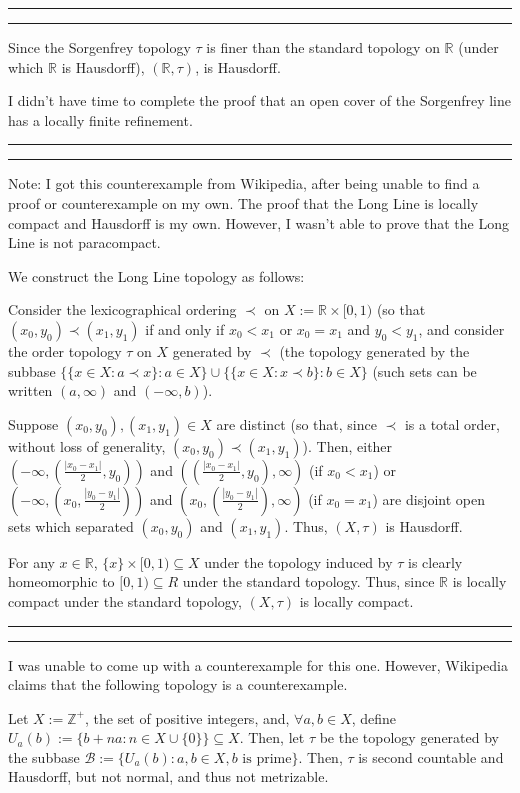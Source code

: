 \documentclass[11pt]{article}
\newcounter{questionCounter}
\newcounter{partCounter}[questionCounter]
\newenvironment{question}[2][\arabic{questionCounter}]{%
    \setcounter{partCounter}{0}%
    \vspace{.25in} \hrule \vspace{0.5em}%
        \noindent{\bf #2}%
    \vspace{0.8em} \hrule \vspace{.10in}%
    \addtocounter{questionCounter}{1}%
}{}
\newcommand{\B}{\mathcal{B}}
\newcommand{\Z}{\mathbb{Z}} %
\newcommand{\R}{\mathbb{R}} %
\begin{document}
\begin{question}{Problem 3}
Since the Sorgenfrey topology $\tau$ is finer than the standard topology on
$\R$ (under which $\R$ is Hausdorff), $(\R,\tau)$, is Hausdorff.

I didn't have time to complete the proof that an open cover of the Sorgenfrey
line has a locally finite refinement.
\end{question}

\begin{question}{Problem 4}
Note: I got this counterexample from Wikipedia, after being unable to find a
proof or counterexample on my own. The proof that the Long Line is locally
compact and Hausdorff is my own. However, I wasn't able to prove that the Long
Line is not paracompact.

We construct the Long Line topology as follows:

Consider the lexicographical ordering $\prec$ on $X := \R \times [0,1)$ (so
that $(x_0,y_0) \prec (x_1,y_1)$ if and only if $x_0 < x_1$ or $x_0 = x_1$ and
$y_0 < y_1$, and consider the order topology $\tau$ on $X$ generated by
$\prec$ (the topology generated by the subbase
$\{\{x \in X : a \prec x\} : a \in X\}
 \cup \{\{x \in X : x \prec b\} : b \in X\}$ (such sets can be written
$(a,\infty)$ and $(-\infty,b)$).

Suppose $(x_0,y_0), (x_1,y_1) \in X$ are distinct (so that, since $\prec$ is a
total order, without loss of generality, $(x_0,y_0) \prec (x_1,y_1)$). Then,
either $\left(-\infty,\left(\frac{|x_0 - x_1|}{2},y_0\right)\right)$ and
$\left(\left(\frac{|x_0 - x_1|}{2},y_0\right),\infty\right)$ (if $x_0 < x_1$)
or $\left(-\infty,\left(x_0,\frac{|y_0 - y_1|}{2}\right)\right)$ and
$\left(x_0,\left(\frac{|y_0 - y_1|}{2}\right),\infty\right)$ (if $x_0 = x_1$)
are disjoint open sets which separated $(x_0,y_0)$ and $(x_1,y_1)$. Thus,
$(X,\tau)$ is Hausdorff.

For any $x \in \R$, $\{x\} \times [0,1) \subseteq X$ under the topology
induced by $\tau$ is clearly homeomorphic to $[0,1) \subseteq R$ under the
standard topology. Thus, since $\R$ is locally compact under the standard
topology, $(X,\tau)$ is locally compact.
\end{question}

\begin{question}{Problem 5}
I was unable to come up with a counterexample for this one. However, Wikipedia
claims that the following topology is a counterexample.

Let $X := \Z^+$, the set of positive integers, and, $\forall a,b \in X$,
define $U_a(b) := \{b + na : n \in X \cup \{0\}\} \subseteq X$. Then, let
$\tau$ be the topology generated by the subbase
$\B := \{U_a(b) : a,b \in X, b \mbox{ is prime}\}$. Then, $\tau$ is second
countable and Hausdorff, but not normal, and thus not metrizable.
\end{question}
\end{document}
